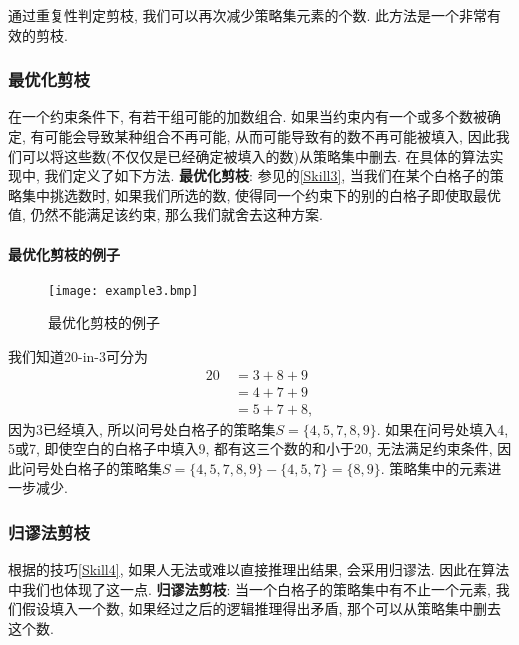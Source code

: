             通过重复性判定剪枝, 我们可以再次减少策略集元素的个数. 此方法是一个非常有效的剪枝.

        \subsubsection{最优化剪枝}
            在一个约束条件下, 有若干组可能的加数组合.
            如果当约束内有一个或多个数被确定, 有可能会导致某种组合不再可能, 从而可能导致有的数不再可能被填入,
            因此我们可以将这些数(不仅仅是已经确定被填入的数)从策略集中删去.
            在具体的算法实现中, 我们定义了如下方法.
            \label{dfnOpt}\textbf{最优化剪枝}:
                参见的\ref{Skill3},
                当我们在某个白格子的策略集中挑选数时, 如果我们所选的数,
                使得同一个约束下的别的白格子即使取最优值, 仍然不能满足该约束,
                那么我们就舍去这种方案.
            \paragraph{最优化剪枝的例子}
                \begin{figure}[htb]
                    \centering
                    \texttt{[image: example3.bmp]}
                    \caption[例3]{最优化剪枝的例子}\label{exm3}
                \end{figure}
                我们知道20-in-3可分为
                \begin{equation*}
                    \begin{split}
                        20\ & = 3+8+9\\
                            & = 4+7+9\\
                            & = 5+7+8,
                    \end{split}
                \end{equation*}
                因为3已经填入, 所以问号处白格子的策略集$S=\{4,5,7,8,9\}$.
                如果在问号处填入4, 5或7, 即使空白的白格子中填入9, 都有这三个数的和小于20, 无法满足约束条件,
                因此问号处白格子的策略集$S=\{4,5,7,8,9\}-\{4,5,7\}=\{8,9\}$.
                策略集中的元素进一步减少.

        \subsubsection{归谬法剪枝}
            根据的技巧\ref{Skill4},
            如果人无法或难以直接推理出结果, 会采用归谬法.
            因此在算法中我们也体现了这一点.
            \label{dfnCtd}\textbf{归谬法剪枝}:
                当一个白格子的策略集中有不止一个元素, 我们假设填入一个数,
                如果经过之后的逻辑推理得出矛盾, 那个可以从策略集中删去这个数.
